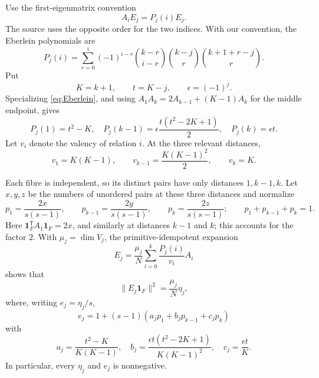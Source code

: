 \documentclass[11pt]{article}
\theoremstyle{plain}
\theoremstyle{remark}
\newcommand{\one}{\boldsymbol{1}}
\begin{document}
Use the first-eigenmatrix convention
\[
 A_iE_j=P_j(i)E_j.
\]
The source \cite[Section~5.1 and Theorem~5.4]
{AljohaniBambergCameron2017} uses the opposite order for the two indices.
With our convention, the Eberlein polynomials are
\begin{equation}\label{eq:Eberlein}
 P_j(i)=\sum_{r=0}^{i}(-1)^{i-r}
 \binom{k-r}{i-r}\binom{k-j}{r}\binom{k+1+r-j}{r}.
\end{equation}
Put
\begin{equation}\label{eq:Kteps}
 K=k+1,\qquad t=K-j,\qquad \epsilon=(-1)^j.
\end{equation}
Specializing \eqref{eq:Eberlein}, and using
$A_1A_k=2A_{k-1}+(K-1)A_k$ for the middle endpoint, gives
\begin{equation}\label{eq:endpoint-eigenvalues}
 \boxed{
 P_j(1)=t^2-K,\quad
 P_j(k-1)=\epsilon\frac{t(t^2-2K+1)}2,\quad
 P_j(k)=\epsilon t.}
\end{equation}
Let $v_i$ denote the valency of relation $i$.  At the three relevant
distances,
\begin{equation}\label{eq:valencies}
 v_1=K(K-1),\qquad
 v_{k-1}=\frac{K(K-1)^2}{2},\qquad
 v_k=K.
\end{equation}

Each fibre is independent, so its distinct pairs have only distances
$1,k-1,k$.  Let $x,y,z$ be the numbers of unordered pairs at these three
distances and normalize
\begin{equation}\label{eq:distance-distribution}
 p_1=\frac{2x}{s(s-1)},\qquad
 p_{k-1}=\frac{2y}{s(s-1)},\qquad
 p_k=\frac{2z}{s(s-1)};\qquad p_1+p_{k-1}+p_k=1.
\end{equation}
Here $\one_F^{\mathsf T}A_1\one_F=2x$, and similarly at distances
$k-1$ and $k$; this accounts for the factor $2$.
With $\mu_j=\dim V_j$, the primitive-idempotent expansion
\[
 E_j=\frac{\mu_j}{N}\sum_{i=0}^k\frac{P_j(i)}{v_i}A_i
\]
shows that
\begin{equation}\label{eq:eta-def}
 \|E_j\one_F\|^2=\frac{\mu_j}{N}\eta_j,
\end{equation}
where, writing $e_j=\eta_j/s$,
\begin{equation}\label{eq:e-general}
e_j=1+(s-1)(a_jp_1+b_jp_{k-1}+c_jp_k)
\end{equation}
with
\begin{equation}\label{eq:abc}
 a_j=\frac{t^2-K}{K(K-1)},\quad
 b_j=\frac{\epsilon t(t^2-2K+1)}{K(K-1)^2},\quad
 c_j=\frac{\epsilon t}{K}.
\end{equation}
In particular, every $\eta_j$ and $e_j$ is nonnegative.
\end{document}
